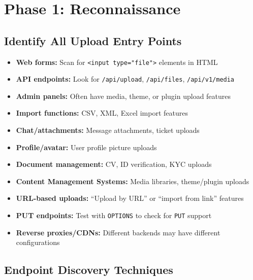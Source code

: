 \documentclass[11pt]{article}
\begin{document}
\section{Phase 1: Reconnaissance}

\subsection{Identify All Upload Entry Points}

\begin{checklistbox}
\begin{itemize}
    \item[\checkmark] \textbf{Web forms:} Scan for \texttt{<input type="file">} elements in HTML
    \item[\checkmark] \textbf{API endpoints:} Look for \texttt{/api/upload}, \texttt{/api/files}, \texttt{/api/v1/media}
    \item[\checkmark] \textbf{Admin panels:} Often have media, theme, or plugin upload features
    \item[\checkmark] \textbf{Import functions:} CSV, XML, Excel import features
    \item[\checkmark] \textbf{Chat/attachments:} Message attachments, ticket uploads
    \item[\checkmark] \textbf{Profile/avatar:} User profile picture uploads
    \item[\checkmark] \textbf{Document management:} CV, ID verification, KYC uploads
    \item[\checkmark] \textbf{Content Management Systems:} Media libraries, theme/plugin uploads
    \item[\checkmark] \textbf{URL-based uploads:} ``Upload by URL'' or ``import from link'' features
    \item[\checkmark] \textbf{PUT endpoints:} Test with \texttt{OPTIONS} to check for \texttt{PUT} support
    \item[\checkmark] \textbf{Reverse proxies/CDNs:} Different backends may have different configurations
\end{itemize}
\end{checklistbox}

\subsection{Endpoint Discovery Techniques}
\end{document}
